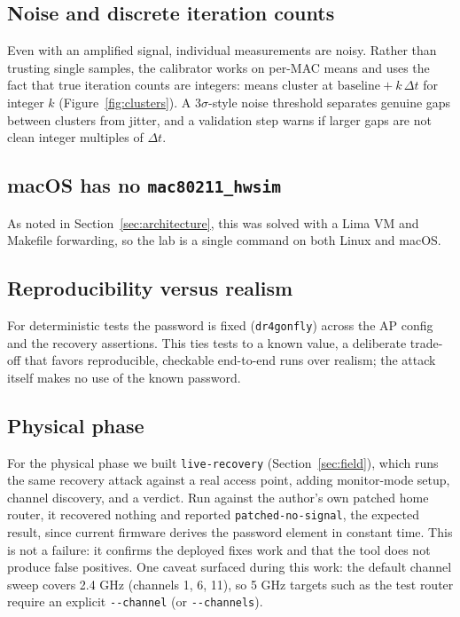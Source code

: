 \documentclass[11pt,letterpaper]{article}
\newcommand{\code}[1]{\texttt{\small #1}}
\begin{document}
\subsection{Noise and discrete iteration counts}
Even with an amplified signal, individual measurements are noisy. Rather than
trusting single samples, the calibrator works on per-MAC means and uses the fact
that true iteration counts are integers: means cluster at
$\mathrm{baseline} + k\,\Delta t$ for integer $k$ (Figure~\ref{fig:clusters}). A
$3\sigma$-style noise threshold separates genuine gaps between clusters from
jitter, and a validation step warns if larger gaps are not clean integer
multiples of $\Delta t$.

\subsection{macOS has no \code{mac80211\_hwsim}}
As noted in Section~\ref{sec:architecture}, this was solved with a Lima VM and
Makefile forwarding, so the lab is a single command on both Linux and macOS.

\subsection{Reproducibility versus realism}
For deterministic tests the password is fixed (\code{dr4gonfly}) across the AP
config and the recovery assertions. This ties tests to a known value, a
deliberate trade-off that favors reproducible, checkable end-to-end runs over
realism; the attack itself makes no use of the known password.

\subsection{Physical phase}
For the physical phase we built \code{live-recovery} (Section~\ref{sec:field}),
which runs the same recovery attack against a real access point, adding
monitor-mode setup, channel discovery, and a verdict. Run against the author's
own patched home router, it recovered nothing
and reported \code{patched-no-signal}, the expected result, since current
firmware derives the password element in constant time. This is not a failure: it
confirms the deployed fixes work and that the tool does not produce false
positives. One caveat surfaced during this work: the default channel sweep covers
2.4 GHz (channels 1, 6, 11), so 5 GHz targets such as the test router require an
explicit \code{-{}-channel} (or \code{-{}-channels}).
\end{document}
